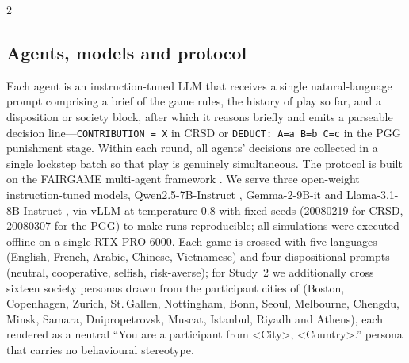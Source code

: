 \documentclass[openacc]{rsproca_new}%
\begin{document}
\begin{multicols}{2}
\subsection{Agents, models and protocol}
Each agent is an instruction-tuned LLM that receives a single natural-language prompt comprising a brief of the game rules, the history of play so far, and a disposition or society block, after which it reasons briefly and emits a parseable decision line---\texttt{CONTRIBUTION = X} in CRSD or \texttt{DEDUCT: A=a B=b C=c} in the PGG punishment stage. Within each round, all agents' decisions are collected in a single lockstep batch so that play is genuinely simultaneous. The protocol is built on the FAIRGAME multi-agent framework \parencite{fairgame2025}. We serve three open-weight instruction-tuned models, Qwen2.5-7B-Instruct \parencite{qwen2025}, Gemma-2-9B-it \parencite{gemma2024} and Llama-3.1-8B-Instruct \parencite{llama2024}, via vLLM at temperature 0.8 with fixed seeds (20080219 for CRSD, 20080307 for the PGG) to make runs reproducible; all simulations were executed offline on a single RTX PRO 6000. Each game is crossed with five languages (English, French, Arabic, Chinese, Vietnamese) and four dispositional prompts (neutral, cooperative, selfish, risk-averse); for Study~2 we additionally cross sixteen society personas drawn from the participant cities of \textcite{herrmann2008antisocial} (Boston, Copenhagen, Zurich, St.\,Gallen, Nottingham, Bonn, Seoul, Melbourne, Chengdu, Minsk, Samara, Dnipropetrovsk, Muscat, Istanbul, Riyadh and Athens), each rendered as a neutral ``You are a participant from <City>, <Country>.'' persona that carries no behavioural stereotype.


\end{multicols}
\end{document}
